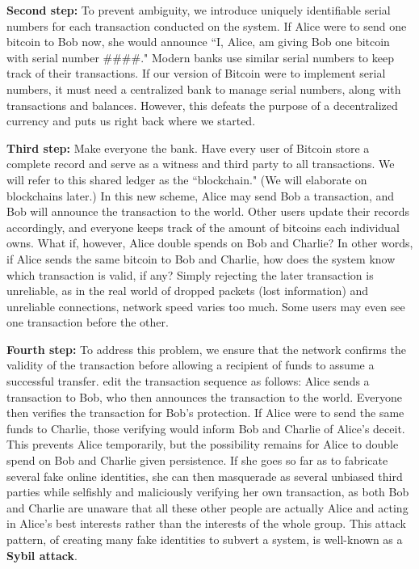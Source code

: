 \documentclass[11pt]{article}
\begin{document}
    \textbf{Second step:} To prevent ambiguity, we introduce uniquely identifiable serial numbers for each transaction conducted on the system. If Alice were to send one bitcoin to Bob now, she would announce ``I, Alice, am giving Bob one bitcoin with serial number \#\#\#\#." Modern banks use similar serial numbers to keep track of their transactions. If our version of Bitcoin were to implement serial numbers, it must need a centralized bank to manage serial numbers, along with transactions and balances. However, this defeats the purpose of a decentralized currency and puts us right back where we started.
    
    \textbf{Third step:} Make everyone the bank. Have every user of Bitcoin store a complete record and serve as a witness and third party to all transactions. We will refer to this shared ledger as the ``blockchain." (We will elaborate on blockchains later.) In this new scheme, Alice may send Bob a transaction, and Bob will announce the transaction to the world. Other users update their records accordingly, and everyone keeps track of the amount of bitcoins each individual owns. What if, \newpage
    \noindent however, Alice double spends on Bob and Charlie? In other words, if Alice sends the same bitcoin to Bob and Charlie, how does the system know which transaction is valid, if any? Simply  rejecting the later transaction is unreliable, as in the real world of dropped packets (lost information) and unreliable connections, network speed varies too much. Some users may even see one transaction before the other.
    
    \textbf{Fourth step:} To address this problem, we ensure that the network confirms the validity of the transaction before allowing a recipient of funds to assume a successful transfer. edit the transaction sequence as follows: Alice sends a transaction to Bob, who then announces the transaction to the world. Everyone then verifies the transaction for Bob's protection. If Alice were to send the same funds to Charlie, those verifying would inform Bob and Charlie of Alice's deceit. This prevents Alice temporarily, but the possibility remains for Alice to double spend on Bob and Charlie given persistence. If she goes so far as to fabricate several fake online identities, she can then masquerade as several unbiased third parties while selfishly and maliciously verifying her own transaction, as both Bob and Charlie are unaware that all these other people are actually Alice and acting in Alice's best interests rather than the interests of the whole group. This attack pattern, of creating many fake identities to subvert a system, is well-known as a \textbf{Sybil attack}.
    
\end{document}
